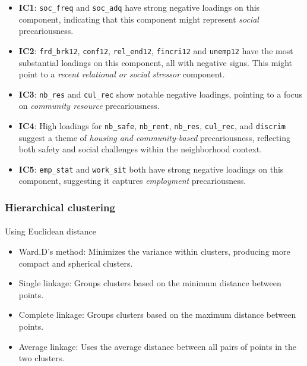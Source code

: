 \documentclass[
]{article}
\makeatletter
\let\oldparagraph\paragraph
\renewcommand{\paragraph}{
    \@ifstar
      \xxxParagraphStar
      \xxxParagraphNoStar
  }
\newcommand{\xxxParagraphStar}[1]{\oldparagraph*{#1}\mbox{}}
\newcommand{\xxxParagraphNoStar}[1]{\oldparagraph{#1}\mbox{}}
\providecommand{\tightlist}{%
  \setlength{\itemsep}{0pt}\setlength{\parskip}{0pt}}\usepackage{longtable,booktabs,array}
\makeatother
\begin{document}
\begin{itemize}
\item
  \textbf{IC1}: \texttt{soc\_freq} and \texttt{soc\_adq} have strong
  negative loadings on this component, indicating that this component
  might represent \emph{social} precariousness.
\item
  \textbf{IC2}: \texttt{frd\_brk12}, \texttt{conf12},
  \texttt{rel\_end12}, \texttt{fincri12} and \texttt{unemp12} have the
  most substantial loadings on this component, all with negative signs.
  This might point to a \emph{recent relational or social stressor}
  component.
\item
  \textbf{IC3}: \texttt{nb\_res} and \texttt{cul\_rec} show notable
  negative loadings, pointing to a focus on \emph{community resource}
  precariousness.
\item
  \textbf{IC4}: High loadings for \texttt{nb\_safe}, \texttt{nb\_rent},
  \texttt{nb\_res}, \texttt{cul\_rec}, and \texttt{discrim} suggest a
  theme of \emph{housing and community-based} precariousness, reflecting
  both safety and social challenges within the neighborhood context.
\item
  \textbf{IC5}: \texttt{emp\_stat} and \texttt{work\_sit} both have
  strong negative loadings on this component, suggesting it captures
  \emph{employment} precariousness.
\end{itemize}

\subsubsection{Hierarchical clustering}\label{hierarchical-clustering}

\paragraph{Using Euclidean distance}\label{using-euclidean-distance}

\begin{itemize}
\tightlist
\item
  Ward.D's method: Minimizes the variance within clusters, producing
  more compact and spherical clusters.
\item
  Single linkage: Groups clusters based on the minimum distance between
  points.
\item
  Complete linkage: Groups clusters based on the maximum distance
  between points.
\item
  Average linkage: Uses the average distance between all pairs of points
  in the two clusters.
\end{itemize}
\end{document}
